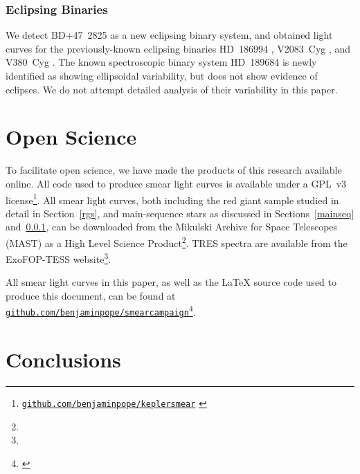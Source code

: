 \documentclass[modern]{aastex62}
\begin{document}
\subsubsection{Eclipsing Binaries}
\label{ebs}

We detect BD+47~2825 as a new eclipsing binary system, and obtained light curves for the previously-known eclipsing binaries HD~186994 \citep{2016AJ....151..101A}, V2083~Cyg \citep{2012MNRAS.421.1196Z}, and V380~Cyg \citep{2003A&A...399.1115C}. The known spectroscopic binary system HD~189684 \citep{2008MNRAS.389..869E} is newly identified as showing ellipsoidal variability, but does not show evidence of eclipses. We do not attempt detailed analysis of their variability in this paper.

\section{Open Science}
\label{open}

To facilitate open science, we have made the products of this research available online. All code used to produce smear light curves is available under a GPL~v3 license\footnote{ \href{https://github.com/benjaminpope/keplersmear}{\nolinkurl{github.com/benjaminpope/keplersmear}} \citep{keplersmear_zenodo}}. All smear light curves, both including the red giant sample studied in detail in Section~\ref{rgs}, and main-sequence stars as discussed in Sections~\ref{mainseq} and~\ref{ebs}, can be downloaded from the Mikulski Archive for Space Telescopes (MAST) as a High Level Science Product\footnote{}. TRES spectra are available from the ExoFOP-TESS website\footnote{}.

All smear light curves in this paper, as well as the \LaTeX{} source code used to produce this document, can be found
at \href{https://github.com/benjaminpope/smearcampaign}{\nolinkurl{github.com/benjaminpope/smearcampaign}}\footnote{ \citep{smearcampaign_zenodo}}.


\section{Conclusions}
\label{conclusions}
\end{document}
